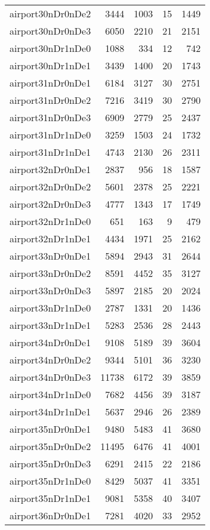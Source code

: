 \begin{longtable}{lrrrr}
airport30nDr0nDe2 & 3444 & 1003 & 15 & 1449 \\
airport30nDr0nDe3 & 6050 & 2210 & 21 & 2151 \\
airport30nDr1nDe0 & 1088 & 334 & 12 & 742 \\
airport30nDr1nDe1 & 3439 & 1400 & 20 & 1743 \\
airport31nDr0nDe1 & 6184 & 3127 & 30 & 2751 \\
airport31nDr0nDe2 & 7216 & 3419 & 30 & 2790 \\
airport31nDr0nDe3 & 6909 & 2779 & 25 & 2437 \\
airport31nDr1nDe0 & 3259 & 1503 & 24 & 1732 \\
airport31nDr1nDe1 & 4743 & 2130 & 26 & 2311 \\
airport32nDr0nDe1 & 2837 & 956 & 18 & 1587 \\
airport32nDr0nDe2 & 5601 & 2378 & 25 & 2221 \\
airport32nDr0nDe3 & 4777 & 1343 & 17 & 1749 \\
airport32nDr1nDe0 & 651 & 163 & 9 & 479 \\
airport32nDr1nDe1 & 4434 & 1971 & 25 & 2162 \\
airport33nDr0nDe1 & 5894 & 2943 & 31 & 2644 \\
airport33nDr0nDe2 & 8591 & 4452 & 35 & 3127 \\
airport33nDr0nDe3 & 5897 & 2185 & 20 & 2024 \\
airport33nDr1nDe0 & 2787 & 1331 & 20 & 1436 \\
airport33nDr1nDe1 & 5283 & 2536 & 28 & 2443 \\
airport34nDr0nDe1 & 9108 & 5189 & 39 & 3604 \\
airport34nDr0nDe2 & 9344 & 5101 & 36 & 3230 \\
airport34nDr0nDe3 & 11738 & 6172 & 39 & 3859 \\
airport34nDr1nDe0 & 7682 & 4456 & 39 & 3187 \\
airport34nDr1nDe1 & 5637 & 2946 & 26 & 2389 \\
airport35nDr0nDe1 & 9480 & 5483 & 41 & 3680 \\
airport35nDr0nDe2 & 11495 & 6476 & 41 & 4001 \\
airport35nDr0nDe3 & 6291 & 2415 & 22 & 2186 \\
airport35nDr1nDe0 & 8429 & 5037 & 41 & 3351 \\
airport35nDr1nDe1 & 9081 & 5358 & 40 & 3407 \\
airport36nDr0nDe1 & 7281 & 4020 & 33 & 2952 \\

\end{longtable}
